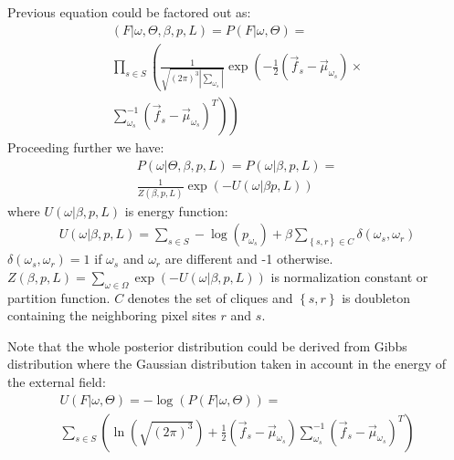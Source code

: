 \documentclass[journal]{IEEEtran}
\begin{document}
Previous equation could be factored out as:
\begin{eqnarray}
\left(F\left|\right.\omega,\Theta,\beta,p,L\right) = 
P\left(F\left|\right.\omega,\Theta\right)=\nonumber \\
\prod_{s \in S}
\left(\frac{1}{\sqrt{\left(2\pi\right)^{3}\left|\sum_{\omega_{s}}\right|}}
\exp\left(
-\frac{1}{2}
\left(\vec{f}_{s}-\vec{\mu}_{\omega_{s}}\right) \right.
\times\nonumber\\
\left.\left.\sum_{\omega_{s}}^{-1}
\left(\vec{f}_{s}-\vec{\mu}_{\omega_{s}}\right)^T \right)\right)
\end{eqnarray}
Proceeding further we have:
\begin{eqnarray}
P\left(\omega\left|\right.\Theta,\beta,p,L\right) = 
P\left(\omega\left|\right.\beta,p,L\right) = \nonumber \\
\frac {1} {Z\left(\beta,p,L\right)}
\exp\left(
-U\left(\omega\left|\right.\beta p,L\right)
\right)
\end{eqnarray}
where $U\left(\omega\left|\right.\beta, p, L \right)$ is energy function:
\begin{eqnarray}
U\left(\omega\left|\right.\beta, p,L\right) = 
\sum_{s\in S}-\log\left(p_{\omega_{s}}\right) +
\beta\sum_{\left\{s,r\right\}\in C}
\delta\left(\omega_{s},\omega_{r}\right)
\end{eqnarray}
$\delta\left(\omega_{s},\omega_{r}\right) = 1$ if $\omega_{s}$ and $\omega_{r}$ are different and -1 otherwise. 
$Z\left(\beta,p,L\right) = \sum_{\omega\in \Omega}\exp\left( -U\left(\omega\left|\right.\beta,p,L\right)\right)$ is normalization constant or partition function. $C$ denotes the set of cliques and $\left\{s,r\right\}$ is doubleton containing the neighboring pixel sites $r$ and $s$.

Note that the whole posterior distribution could be derived from Gibbs distribution where the Gaussian distribution taken in account in the energy of the external field:
\begin{eqnarray}
U\left(F\left|\right.\omega,\Theta\right) = 
-\log\left(P\left(F\left|\right.\omega,\Theta\right)\right) = \nonumber \\
\sum\limits_{s\in S}\left(
\ln\left(\sqrt{\left(2\pi\right)^{3}}\right) +
\frac{1}{2}
\left(\vec{f}_{s}-\vec{\mu}_{\omega_{s}}\right)
\sum_{\omega_{s}}^{-1}
\left(\vec{f}_{s}-\vec{\mu}_{\omega_{s}}\right)^T\right)
\end{eqnarray}
\end{document}

